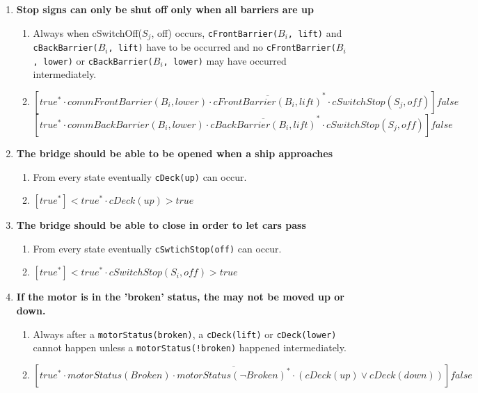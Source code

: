 \begin{enumerate}
	\item \textbf{Stop signs can only be shut off only when all barriers are up}
	\begin{enumerate}
		\item Always when cSwitchOff($S_j$, off) occurs, \texttt{cFrontBarrier($B_i$, lift)} and \texttt{cBackBarrier($B_i$, lift)} have to be occurred and no \texttt{cFrontBarrier($B_i$, lower)} or \texttt{cBackBarrier($B_i$, lower)} may have occurred intermediately.
		\item $[true^* \cdot commFrontBarrier(B_i, lower) \cdot \overline{cFrontBarrier(B_i, lift)}^{*} \cdot cSwitchStop(S_j, off)]false$
					$[true^* \cdot commBackBarrier(B_i, lower) \cdot \overline{cBackBarrier(B_i, lift)}^{*} \cdot cSwitchStop(S_j, off)]false$
	\end{enumerate}

	\item \textbf{The bridge should be able to be opened when a ship approaches}
	\begin{enumerate}
		\item From every state eventually \texttt{cDeck(up)} can occur.
		\item $[true^*]<true^* \cdot cDeck(up)>true$
	\end{enumerate}

	\item \textbf{The bridge should be able to close in order to let cars pass}
	\begin{enumerate}
		\item From every state eventually \texttt{cSwtichStop(off)} can occur.
		\item $[true^*]<true^* \cdot cSwitchStop(S_i, off)>true$
	\end{enumerate}

	\item \textbf{If the motor is in the 'broken' status, the may not be moved up or down.}
	\begin{enumerate}
		\item Always after a \texttt{motorStatus(broken)}, a \texttt{cDeck(lift)} or \texttt{cDeck(lower)} cannot happen unless a \texttt{motorStatus(!broken)} happened intermediately.
		\item $[true^* \cdot motorStatus(Broken) \cdot \overline{motorStatus(\neg Broken)^*}  \cdot (cDeck(up) \vee cDeck(down))]false$
	\end{enumerate}

\end{enumerate}

